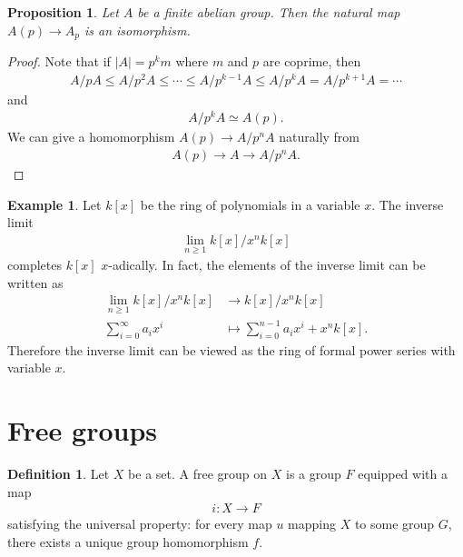 \documentclass[12pt]{report}
\theoremstyle{plain}
\newtheorem{proposition}[theorem]{Proposition}
\theoremstyle{remark}
\theoremstyle{definition}
\newtheorem{definition}[theorem]{Definition}
\newtheorem{example}[theorem]{Example}
\begin{document}
\begin{proposition}
    Let $A$ be a finite abelian group. Then the natural map $A(p)\rightarrow A_p$ is an isomorphism.
\end{proposition}
\begin{proof}
    Note that if $|A|=p^km$ where $m$ and $p$ are coprime, then
    \begin{align*}
        A/pA \le A / p^2 A \le \cdots \le A / p^{k-1}A \le A / p^k A = A / p^{k+1}A = \cdots
    \end{align*}
    and
    \begin{align*}
        A / p^k A \simeq A(p).
    \end{align*}
    We can give a homomorphism $A(p)\rightarrow A/p^n A$ naturally from
    \begin{align*}
        A(p) \rightarrow A \rightarrow A/p^n A.
    \end{align*}
\end{proof}

\begin{example}
    Let $k[x]$ be the ring of polynomials in a variable $x$. The inverse limit
    \begin{align*}
        \lim_{n\ge 1} k[x] / x^n k[x]
    \end{align*}
    completes $k[x]$ $x$-adically. In fact, the elements of the inverse limit can be written as
    \begin{align*}
        \lim_{n\ge 1} k[x] / x^n k[x] &\rightarrow k[x] / x^n k[x] \\
        \sum_{i=0}^\infty a_i x^i &\mapsto \sum_{i=0}^{n-1} a_i x^i + x^nk[x].
    \end{align*}
    Therefore the inverse limit can be viewed as the ring of formal power series with variable $x$.
\end{example}


\section{Free groups}
\begin{definition}
    Let $X$ be a set. A free group on $X$ is a group $F$ equipped with a map
    \begin{align*}
        i:X\rightarrow F
    \end{align*}
    satisfying the universal property: for every map $u$ mapping $X$ to some group $G$, there exists a unique group homomorphism $f$.
    \begin{figure}[H]
    \centering
    \end{figure}
\end{definition}
\end{document}

